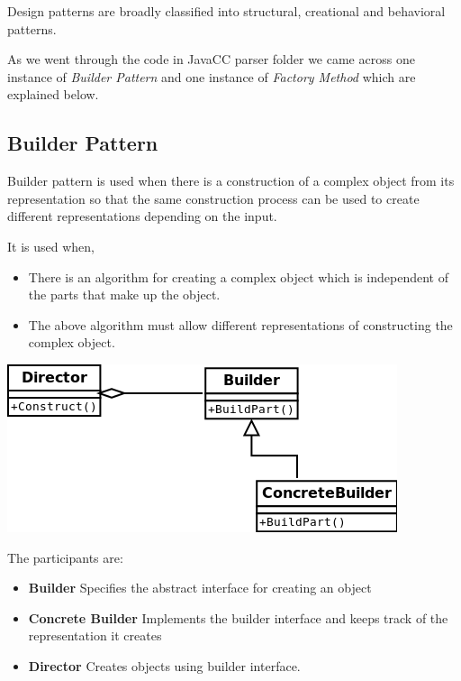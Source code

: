 \documentclass[oneside]{book}
\begin{document}
Design patterns are broadly classified into structural, creational and behavioral patterns.

As we went through the code in JavaCC parser folder we came across one instance of \textit{Builder Pattern} and one instance of \textit{Factory Method} which are explained below.

\subsection{Builder Pattern}
Builder pattern is used when there is a construction of a complex object from its representation so that the same construction process can be used to create different representations depending on the input.

It is used when,
\begin{itemize}
\item There is an algorithm for creating a complex object which is independent of the parts that make up the object.
\item The above algorithm must allow different representations of constructing the complex object.
\end{itemize}

\begin{center}
\includegraphics[scale=0.5]{Builder.png}
\end{center}

The participants are:
\begin{itemize}
\item \textbf{Builder} Specifies the abstract interface for creating an object
\item \textbf{Concrete Builder} Implements the builder interface and keeps track of the representation it creates
\item \textbf{Director} Creates objects using builder interface.
\end{itemize}
\end{document}
